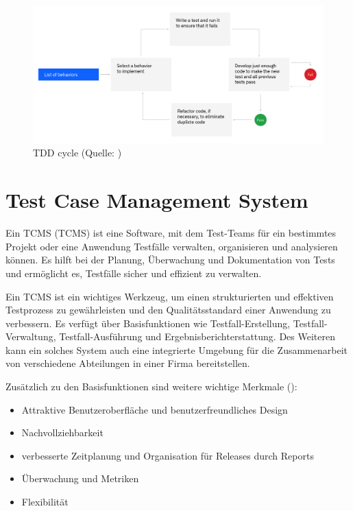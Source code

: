\documentclass[a4paper, fontsize=11pt, parskip=half, twoside, headings=openright]{scrreprt}
\begin{document}
	\begin{figure}[ht]
		\centering
		\includegraphics[scale=0.25]{assets/tdd-cycle.png}
		\caption{\acl{TDD} cycle (Quelle: \textcite{noauthor_test-driven_nodate})}
		\label{fig:tdd-cycle}
	\end{figure}
	
	\section{Test Case Management System} \label{sec:tcms}
	Ein \acl{TCMS} (\ac{TCMS}) ist eine Software, mit dem Test-Teams für ein bestimmtes Projekt oder eine Anwendung Testfälle verwalten, organisieren und analysieren können.
	Es hilft bei der Planung, Überwachung und Dokumentation von Tests und ermöglicht es, Testfälle sicher und effizient zu verwalten.
	
	Ein \ac{TCMS} ist ein wichtiges Werkzeug, um einen strukturierten und effektiven Testprozess zu gewährleisten und den Qualitätsstandard einer Anwendung zu verbessern.
	Es verfügt über Basisfunktionen wie Testfall-Erstellung, Testfall-Verwaltung, Testfall-Ausführung und Ergebnisberichterstattung. 
	Des Weiteren kann ein solches System auch eine integrierte Umgebung für die Zusammenarbeit von verschiedene Abteilungen in einer Firma bereitstellen.
	
	Zusätzlich zu den Basisfunktionen sind weitere wichtige Merkmale (\textcite{lead_articles_nodate}):
	
	\begin{itemize}
		\item Attraktive Benutzeroberfläche und benutzerfreundliches Design
		\item Nachvollziehbarkeit
		\item verbesserte Zeitplanung und Organisation für Releases durch Reports
		\item Überwachung und Metriken
		\item Flexibilität
	\end{itemize}
	
\end{document}
